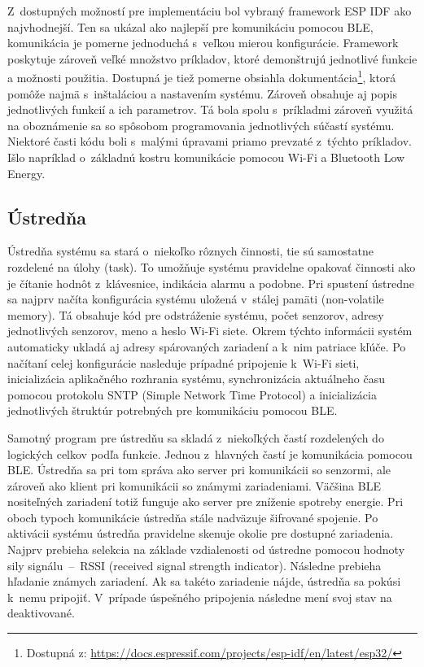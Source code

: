 Z~dostupných možností pre implementáciu bol vybraný framework ESP IDF ako najvhodnejší. Ten sa ukázal ako najlepší pre komunikáciu pomocou BLE, komunikácia je pomerne jednoduchá s~veľkou mierou konfigurácie. Framework poskytuje zároveň veľké množstvo príkladov, ktoré demonštrujú jednotlivé funkcie a možnosti použitia. Dostupná je tiež pomerne obsiahla dokumentácia\footnote{Dostupná z: \url{https://docs.espressif.com/projects/esp-idf/en/latest/esp32/}}, ktorá pomôže najmä s~inštaláciou a nastavením systému. Zároveň obsahuje aj popis jednotlivých funkcií a ich parametrov. Tá bola spolu s~príkladmi zároveň využitá na oboznámenie sa so spôsobom programovania jednotlivých súčastí systému. Niektoré časti kódu boli s~malými úpravami priamo prevzaté z~týchto príkladov. Išlo napríklad o~základnú kostru komunikácie pomocou Wi-Fi a Bluetooth Low Energy.

\subsection{Ústredňa}

Ústredňa systému sa stará o~niekoľko rôznych činnosti, tie sú samostatne rozdelené na úlohy (task). To umožňuje systému pravidelne opakovať činnosti ako je čítanie hodnôt z~klávesnice, indikácia alarmu a podobne. Pri spustení ústredne sa najprv načíta konfigurácia systému uložená v~stálej pamäti (non-volatile memory). Tá obsahuje kód pre odstráženie systému, počet senzorov, adresy jednotlivých senzorov, meno a heslo Wi-Fi siete. Okrem týchto informácii systém automaticky ukladá aj adresy spárovaných zariadení a k~nim patriace kľúče. Po načítaní celej konfigurácie nasleduje prípadné pripojenie k~Wi-Fi sieti, inicializácia aplikačného rozhrania systému, synchronizácia aktuálneho času pomocou protokolu SNTP (Simple Network Time Protocol) a inicializácia jednotlivých štruktúr potrebných pre komunikáciu pomocou BLE. 

Samotný program pre ústredňu sa skladá z~niekoľkých častí rozdelených do logických celkov podľa funkcie. Jednou z~hlavných častí je komunikácia pomocou BLE. Ústredňa sa pri tom správa ako server pri komunikácii so senzormi, ale zároveň ako klient pri komunikácii so známymi zariadeniami. Väčšina BLE nositeľných zariadení totiž funguje ako server pre zníženie spotreby energie. Pri oboch typoch komunikácie ústredňa stále nadväzuje šifrované spojenie. Po aktivácii systému ústredňa pravidelne skenuje okolie pre dostupné zariadenia. Najprv prebieha selekcia na základe vzdialenosti od ústredne pomocou hodnoty sily signálu~--~RSSI (received signal strength indicator). Následne prebieha hľadanie známych zariadení. Ak sa takéto zariadenie nájde, ústredňa sa pokúsi k~nemu pripojiť. V~prípade úspešného pripojenia následne mení svoj stav na deaktivované.

